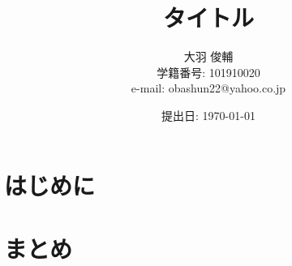 \documentclass[uplatex,dvipdfmx,a4paper]{jarticle}
\title{タイトル}
\author{大羽 俊輔\\ \small{学籍番号: 101910020}\\ \small{e-mail: obashun22@yahoo.co.jp}}
\date{提出日: \today}
\begin{document}
\maketitle

\begin{abstract}

\end{abstract}
\newpage

\tableofcontents
\newpage

\section{はじめに}
\section{}
\subsection{}

\section{まとめ}

% 
\end{document}
